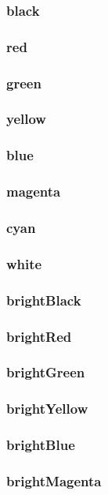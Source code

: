 \documentclass[10pt,a4paper]{report}
\begin{document}
			\subsubsection{black}
			\subsubsection{red}
			\subsubsection{green}
			\subsubsection{yellow}
			\subsubsection{blue}
			\subsubsection{magenta}
			\subsubsection{cyan}
			\subsubsection{white}
			\subsubsection{brightBlack}
			\subsubsection{brightRed}
			\subsubsection{brightGreen}
			\subsubsection{brightYellow}
			\subsubsection{brightBlue}
			\subsubsection{brightMagenta}
\end{document}

